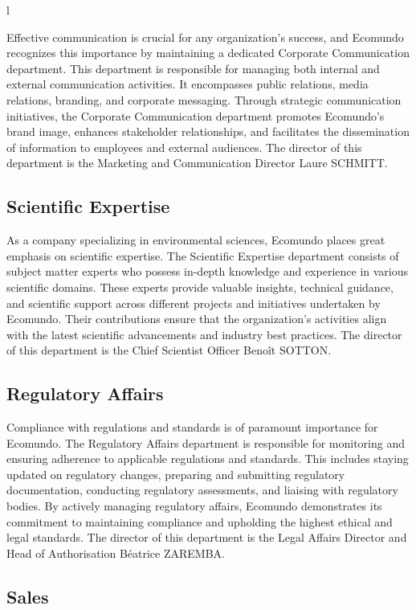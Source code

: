 l\documentclass[a4paper,12pt,twoside]{report}
\begin{document}
Effective communication is crucial for any organization's success, and Ecomundo recognizes this importance by maintaining a dedicated Corporate Communication department. This department is responsible for managing both internal and external communication activities. It encompasses public relations, media relations, branding, and corporate messaging. Through strategic communication initiatives, the Corporate Communication department promotes Ecomundo's brand image, enhances stakeholder relationships, and facilitates the dissemination of information to employees and external audiences. The director of this department is the Marketing and Communication Director Laure SCHMITT.

\subsection{Scientific Expertise}

As a company specializing in environmental sciences, Ecomundo places great emphasis on scientific expertise. The Scientific Expertise department consists of subject matter experts who possess in-depth knowledge and experience in various scientific domains. These experts provide valuable insights, technical guidance, and scientific support across different projects and initiatives undertaken by Ecomundo. Their contributions ensure that the organization's activities align with the latest scientific advancements and industry best practices. The director of this department is the Chief Scientist Officer Benoît SOTTON.

\subsection{Regulatory Affairs}

Compliance with regulations and standards is of paramount importance for Ecomundo. The Regulatory Affairs department is responsible for monitoring and ensuring adherence to applicable regulations and standards. This includes staying updated on regulatory changes, preparing and submitting regulatory documentation, conducting regulatory assessments, and liaising with regulatory bodies. By actively managing regulatory affairs, Ecomundo demonstrates its commitment to maintaining compliance and upholding the highest ethical and legal standards. The director of this department is the Legal Affairs Director and Head of Authorisation Béatrice ZAREMBA.

\subsection{Sales}
\end{document}
